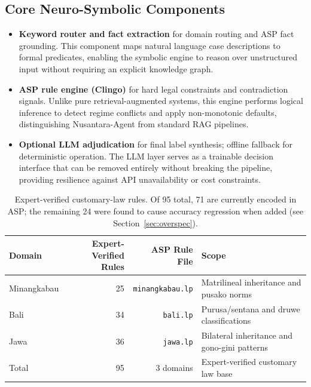\documentclass[11pt]{article}
\begin{document}
\subsection{Core Neuro-Symbolic Components}
\begin{itemize}[nosep]
  \item \textbf{Keyword router and fact extraction} for domain routing and ASP fact grounding. This component maps natural language case descriptions to formal predicates, enabling the symbolic engine to reason over unstructured input without requiring an explicit knowledge graph.
  \item \textbf{ASP rule engine (Clingo)} for hard legal constraints and contradiction signals. Unlike pure retrieval-augmented systems, this engine performs logical inference to detect regime conflicts and apply non-monotonic defaults, distinguishing Nusantara-Agent from standard RAG pipelines.
  \item \textbf{Optional LLM adjudication} for final label synthesis; offline fallback for deterministic operation. The LLM layer serves as a trainable decision interface that can be removed entirely without breaking the pipeline, providing resilience against API unavailability or cost constraints.
\end{itemize}

\begin{table}[h]
\centering
\begin{tabular}{lrrl}
\toprule
Domain & Expert-Verified Rules & ASP Rule File & Scope \\
\midrule
Minangkabau & 25 & \texttt{minangkabau.lp} & Matrilineal inheritance and pusako norms \\
Bali & 34 & \texttt{bali.lp} & Purusa/sentana and druwe classifications \\
Jawa & 36 & \texttt{jawa.lp} & Bilateral inheritance and gono-gini patterns \\
\midrule
Total & 95 & 3 domains & Expert-verified customary law base \\
\bottomrule
\end{tabular}
\caption{Expert-verified customary-law rules. Of 95 total, 71 are currently encoded in ASP; the remaining 24 were found to cause accuracy regression when added (see Section~\ref{sec:overspec}).}
\label{tab:rulebase}
\end{table}
\end{document}
